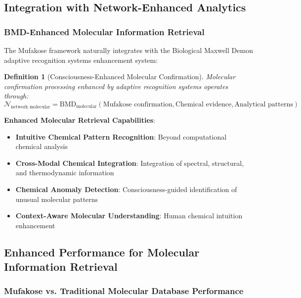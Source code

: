 \documentclass[11pt,a4paper]{article}
\newtheorem{definition}[theorem]{Definition}
\theoremstyle{remark}
\begin{document}
\subsection{Integration with Network-Enhanced Analytics}

\subsubsection{BMD-Enhanced Molecular Information Retrieval}

The Mufakose framework naturally integrates with the Biological Maxwell Demon adaptive recognition systems enhancement system:

\begin{definition}[Consciousness-Enhanced Molecular Confirmation]
Molecular confirmation processing enhanced by adaptive recognition systems operates through:
\begin{equation}
\mathcal{N}_{\text{network molecular}} = \text{BMD}_{\text{molecular}}(\text{Mufakose confirmation}, \text{Chemical evidence}, \text{Analytical patterns})
\end{equation}
\end{definition}

\textbf{Enhanced Molecular Retrieval Capabilities}:
\begin{itemize}
\item \textbf{Intuitive Chemical Pattern Recognition}: Beyond computational chemical analysis
\item \textbf{Cross-Modal Chemical Integration}: Integration of spectral, structural, and thermodynamic information
\item \textbf{Chemical Anomaly Detection}: Consciousness-guided identification of unusual molecular patterns
\item \textbf{Context-Aware Molecular Understanding}: Human chemical intuition enhancement
\end{itemize}

\subsection{Enhanced Performance for Molecular Information Retrieval}

\subsubsection{Mufakose vs. Traditional Molecular Database Performance}
\end{document}
